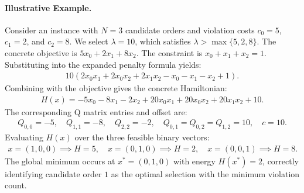 \documentclass[12pt]{article}
\begin{document}
\paragraph{Illustrative Example.}
Consider an instance with $N=3$ candidate orders and violation costs $c_0 = 5$, $c_1 = 2$, and $c_2 = 8$. We select $\lambda = 10$, which satisfies $\lambda > \max\{5, 2, 8\}$. The concrete objective is $5x_0 + 2x_1 + 8x_2$. The constraint is $x_0 + x_1 + x_2 = 1$. Substituting into the expanded penalty formula yields:
\begin{align}
10 \left( 2x_0x_1 + 2x_0x_2 + 2x_1x_2 - x_0 - x_1 - x_2 + 1 \right).
\end{align}
Combining with the objective gives the concrete Hamiltonian:
\begin{align}
H(x) = -5x_0 - 8x_1 - 2x_2 + 20x_0x_1 + 20x_0x_2 + 20x_1x_2 + 10.
\end{align}
The corresponding Q matrix entries and offset are:
\begin{align}
Q_{0,0} = -5, \quad Q_{1,1} = -8, \quad Q_{2,2} = -2, \quad Q_{0,1} = Q_{0,2} = Q_{1,2} = 10, \quad c = 10.
\end{align}
Evaluating $H(x)$ over the three feasible binary vectors:
\begin{align}
x = (1,0,0) \implies H = 5, \quad x = (0,1,0) \implies H = 2, \quad x = (0,0,1) \implies H = 8.
\end{align}
The global minimum occurs at $x^* = (0,1,0)$ with energy $H(x^*) = 2$, correctly identifying candidate order $1$ as the optimal selection with the minimum violation count.
\end{document}
